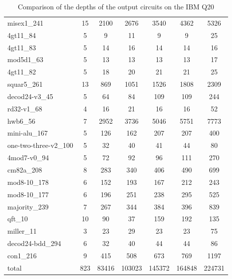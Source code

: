 \documentclass[runningheads]{llncs}
\begin{document}
\begin{table}[!ht]
\begin{center}
\begin{tabular}{|p{4.3cm}<{\centering}|c|c|c|c|c|c|}
							misex1\_241 & 15 & 2100 & 2676 & 3540 & 4362 & 5326 \\
							4gt11\_84 & 5 & 9 & 11 & 9 & 9 & 25 \\
							4gt11\_83 & 5 & 14 & 16 & 14 & 14 & 16 \\
							mod5d1\_63 & 5 & 13 & 13 & 13 & 13 & 17 \\
							4gt11\_82 & 5 & 18 & 20 & 21 & 21 & 25 \\
							squar5\_261 & 13 & 869 & 1051 & 1526 & 1808 & 2309 \\
							decod24-v3\_45 & 5 & 64 & 84 & 109 & 109 & 244 \\
							rd32-v1\_68 & 4 & 16 & 21 & 16 & 16 & 52 \\
							hwb6\_56 & 7 & 2952 & 3736 & 5046 & 5751 & 7773 \\
							mini-alu\_167 & 5 & 126 & 162 & 207 & 207 & 400 \\
							one-two-three-v2\_100 & 5 & 32 & 40 & 41 & 44 & 80 \\
							4mod7-v0\_94 & 5 & 72 & 92 & 96 & 111 & 270 \\
							cm82a\_208 & 8 & 283 & 340 & 406 & 490 & 699 \\
							mod8-10\_178 & 6 & 152 & 193 & 167 & 212 & 243 \\
							mod8-10\_177 & 6 & 196 & 251 & 238 & 295 & 525 \\
							majority\_239 & 7 & 267 & 344 & 384 & 396 & 839 \\
							qft\_10 & 10 & 90 & 37 & 159 & 192 & 135 \\
							miller\_11 & 3 & 23 & 29 & 23 & 23 & 75 \\
							decod24-bdd\_294 & 6 & 32 & 40 & 44 & 44 & 86 \\
							con1\_216 & 9 & 415 & 508 & 673 & 769 & 1197 \\
							\hline
							total & 823 & 83416 & 103023 & 145372 & 164848 & 224731  \\
							\hline
								\end{tabular} 
								\end{center}						
								\caption{Comparison of  the depths of the output circuits on the IBM Q20} 
								\label{tab9}
							\end{table}
\end{document}
